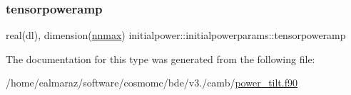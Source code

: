 \mbox{\label{structinitialpower_1_1initialpowerparams_ae42782122688b96c1d48eda105c2faf9}} 
\subsubsection{\texorpdfstring{tensorpoweramp}{tensorpoweramp}}
{\footnotesize\ttfamily real(dl), dimension(\mbox{\hyperlink{namespaceinitialpower_a9749c023ff83f7ffa2677dc578379c10}{nnmax}}) initialpower\+::initialpowerparams\+::tensorpoweramp\hspace{0.3cm}{\ttfamily [private]}}



The documentation for this type was generated from the following file\+:\begin{DoxyCompactItemize}
\item 
/home/ealmaraz/software/cosmomc/bde/v3./camb/\mbox{\hyperlink{power__tilt_8f90}{power\+\_\+tilt.\+f90}}\end{DoxyCompactItemize}
